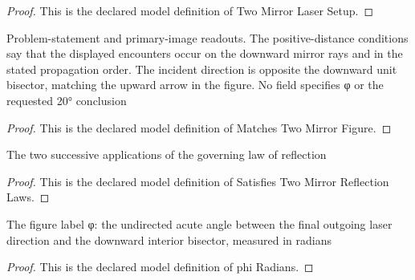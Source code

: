 \begin{proof}
  This is the declared model definition of Two Mirror Laser Setup.
\end{proof}
\begin{definition}
  \label{def:physics:phyx-mini-0069:phyxminiproblems-problemphyxmini0069-matchestwomirrorfigure}
  Problem-statement and primary-image readouts. The positive-distance conditions say that the displayed encounters occur on the downward mirror rays and in the stated propagation order. The incident direction is opposite the downward unit bisector, matching the upward arrow in the figure. No field specifies φ or the requested 20° conclusion
\end{definition}
\begin{proof}
  This is the declared model definition of Matches Two Mirror Figure.
\end{proof}
\begin{definition}
  \label{def:physics:phyx-mini-0069:phyxminiproblems-problemphyxmini0069-satisfiestwomirrorreflectionlaws}
  The two successive applications of the governing law of reflection
\end{definition}
\begin{proof}
  This is the declared model definition of Satisfies Two Mirror Reflection Laws.
\end{proof}
\begin{definition}
  \label{def:physics:phyx-mini-0069:phyxminiproblems-problemphyxmini0069-phiradians}
  The figure label φ: the undirected acute angle between the final outgoing laser direction and the downward interior bisector, measured in radians
\end{definition}
\begin{proof}
  This is the declared model definition of phi Radians.
\end{proof}
